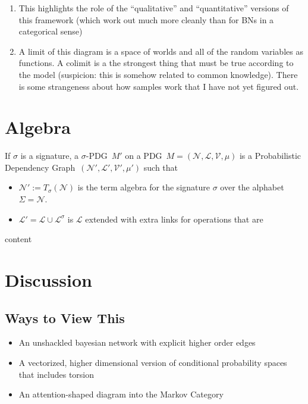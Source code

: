 \documentclass{article}
\newcommand{\modelname}{Probabilistic Dependency Graph}
\newcommand{\MN}{PDG}%
\begin{document}
\begin{vcat}
\begin{enumerate}
			\item This highlights the role of the ``qualitative'' and ``quantitative'' versions of this framework (which work out much more cleanly than for BNs in a categorical sense)
			
			\item A limit of this diagram is a space of worlds and all of the random variables as functions. A colimit is a the strongest thing that must be true according to the model (suspicion: this is somehow related to common knowledge). There is some strangeness about how samples work that I have not yet figured out.
		\end{enumerate}


		\section{Algebra}\label{sec:algebra}
		\begin{defn}
			If $\sigma$ is a signature, a $\sigma$-\MN\ $M'$ on a \MN\ $M=(\mathcal N, \mathcal L, \mathcal V, \mu)$ is a \modelname\ $(\mathcal N', \mathcal L', \mathcal V', \mu')$ such that
			\begin{itemize}
				\item $\mathcal N':= T_\sigma(\mathcal N)$ is the term algebra for the signature $\sigma$ over the alphabet $\Sigma = \mathcal N$.
				\item $\mathcal L' = \mathcal L \cup \mathcal L^\sigma$ is $\mathcal L$ extended with extra links for operations that are 
			\end{itemize}
		\end{defn}
		
		\begin{example}
			content
		\end{example}		
	\end{vcat}

	\section{Discussion}
	
	
	\subsection{Ways to View This}
	\begin{itemize}
		\item An unshackled bayesian network with explicit higher order edges
		\item A vectorized, higher dimensional version of conditional probability spaces that includes torsion
		\item An attention-shaped diagram into the Markov Category
	\end{itemize}	
\end{document}
